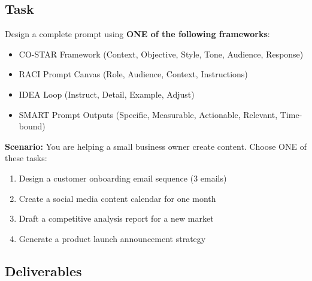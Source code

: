 \documentclass[11pt]{article}
\begin{document}
\subsection*{Task}

Design a complete prompt using \textbf{ONE of the following frameworks}:

\begin{itemize}
    \item CO-STAR Framework (Context, Objective, Style, Tone, Audience, Response)
    \item RACI Prompt Canvas (Role, Audience, Context, Instructions)
    \item IDEA Loop (Instruct, Detail, Example, Adjust)
    \item SMART Prompt Outputs (Specific, Measurable, Actionable, Relevant, Time-bound)
\end{itemize}

\textbf{Scenario:} You are helping a small business owner create content. Choose ONE of these tasks:

\begin{enumerate}
    \item Design a customer onboarding email sequence (3 emails)
    \item Create a social media content calendar for one month
    \item Draft a competitive analysis report for a new market
    \item Generate a product launch announcement strategy
\end{enumerate}

\subsection*{Deliverables}
\end{document}
